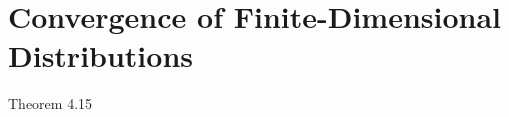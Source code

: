 \section{Convergence of Finite-Dimensional Distributions}
	\begin{itembox}[l]{Theorem 4.15}
		
	\end{itembox}
	
	\begin{sketch}
		
	\end{sketch}